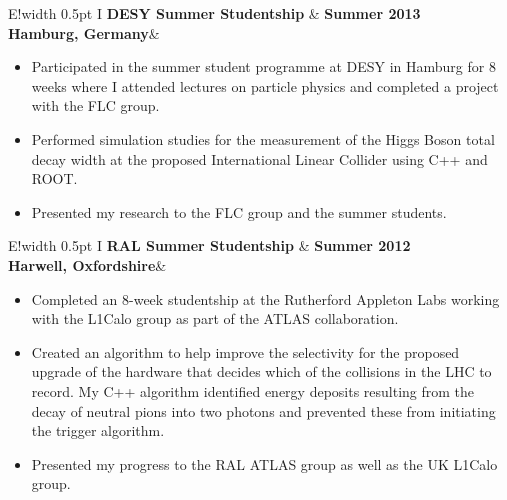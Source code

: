 \documentclass[11pt,a4paper]{article}
\newcommand\VRule{\color{lightgray}\vrule width 0.5pt}
\begin{document}
\noindent\begin{tabular}{E!{\VRule} I }
{\bf DESY Summer Studentship}   & {\bf Summer 2013}\\
{\bf Hamburg, Germany}&\\
\end{tabular}

\noindent
\begin{itemize}
\setlength\itemsep{0em}
\item Participated in the summer student programme at DESY in Hamburg for 8 weeks where I attended lectures on particle physics and completed a project with the FLC group.
\item Performed simulation studies for the measurement of the Higgs Boson total decay width at the proposed International Linear Collider using C++ and ROOT. 
\item Presented my research to the FLC group and the summer students. \\
\end{itemize}


\noindent\begin{tabular}{E!{\VRule} I }
{\bf RAL Summer Studentship}   & {\bf Summer 2012 }\\
{\bf Harwell, Oxfordshire}&\\[5pt]
\end{tabular}
\noindent 
\begin{itemize}
\setlength\itemsep{0em}
\item Completed an 8-week studentship at the Rutherford Appleton Labs working with the L1Calo group as part of the ATLAS collaboration. 
\item Created an algorithm to help improve the selectivity for the proposed upgrade of the hardware that decides which of the collisions in the LHC to record. My C++ algorithm identified energy deposits resulting from the decay of neutral pions into two photons and prevented these from initiating the trigger algorithm. 
\item Presented my progress to the RAL ATLAS group as well as the UK L1Calo group.
\end{itemize}
\end{document}
